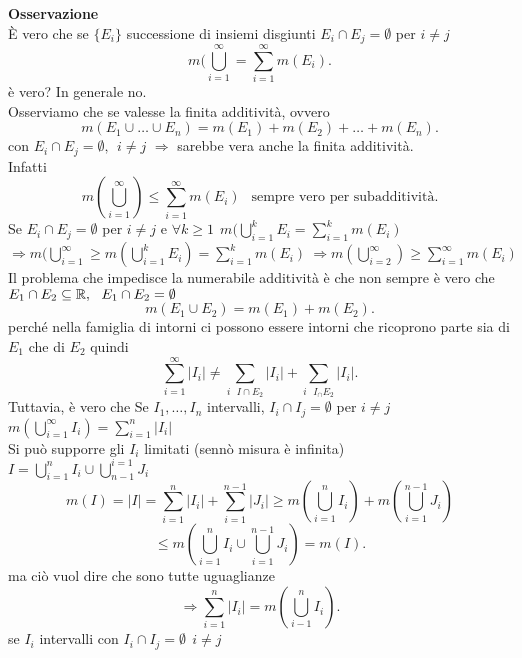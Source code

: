 \documentclass[12px]{article}
\begin{document}
	\textbf{Osservazione}\\
	È vero che se $\{E_i\}$ successione di insiemi disgiunti $E_i\cap E_j = \emptyset$ per $i\neq j$\\
	 \[
	m( \bigcup^{\infty}_{i=1} = \sum^{\infty}_{i=1}m(E_i)
	.\]
	è vero? In generale no.\\
	Osserviamo che se valesse la finita additività, ovvero
	\[
	m(E_1\cup\ldots\cup E_n) = m(E_1) + m(E_2) + \ldots + m(E_n)
	.\] 
	con $E_i\cap E_j = \emptyset,\ \  i\neq j$
	 $ \Rightarrow$ sarebbe vera anche la finita additività.\\
	 Infatti\\
	 \[
		 m( \bigcup^{\infty}_{i=1})\leq \sum^{\infty}_{i=1}m(E_i) \ \ \text{ sempre vero per subadditività}
	 .\] 
	 Se $E_i\cap E_j = \emptyset$ per $i\neq j$ e  $\displaystyle\forall k\geq 1 \ \ m( \bigcup^{k}_{i= 1}E_i = \sum^{k}_{i=1}m(E_i)$\\
 $\displaystyle \Rightarrow m( \bigcup^{\infty}_{i=1} \geq m( \bigcup^{k}_{ i=1}E_i) = \sum^{k}_{i=1}m(E_i) \ \Rightarrow m( \bigcup^{\infty}_{i=2}) \geq \sum^{\infty}_{i=1}m(E_i)$\\
 Il problema che impedisce la numerabile additività è che non sempre è vero che $E_1\cap E_2\subseteq\mathbb{R}, \ \ E_1\cap E_2=\emptyset$
 \[
 m(E_1\cup E_2) = m(E_1) + m(E_2)
 .\] 
 perché nella famiglia di intorni ci possono essere intorni che ricoprono parte sia di $E_1$ che di $E_2$ quindi
 \[
 \sum^{\infty}_{i=1}|I_i|\neq \sum^{}_{i
 \ \ \ I\cap E_2}|I_i| + \sum^{}_{i\ \ \  I_\cap E_2}|I_i|
 .\] 
 Tuttavia, è vero che Se $I_1,\ldots, I_n$ intervalli, $I_i\cap I_j = \emptyset $ per $i\neq j$\\
  $m( \bigcup^{\infty}_{i=1}I_i) = \sum^{n}_{i=1}|I_i|$\\
  Si può supporre gli $I_i$ limitati (sennò misura è infinita)\\
  $\displaystyle I = \bigcup^{n}_{i=1}I_i \cup \bigcup^{i=1}_{n-1}J_i$
  \[
  m(I) = |I| = \sum^{n}_{i=1}|I_i| + \sum^{n-1}_{i=1}|J_i| \geq m( \bigcup^{n}_{i=1}I_i) + m( \bigcup^{n-1}_{i=1}J_i)
  \] 
  \[
   \leq m( \bigcup^{n}_{i=1}I_i\cup \bigcup^{n-1}_{i=1}J_i) = m(I)
  .\] 
  ma ciò vuol dire che sono tutte uguaglianze
  \[
   \Rightarrow \sum^{n}_{i=1}|I_i| = m( \bigcup^{n}_{i-1}I_i)
  .\] 
  se $I_i$ intervalli con $I_i\cap I_j = \emptyset \ \ i\neq j$
\end{document}
